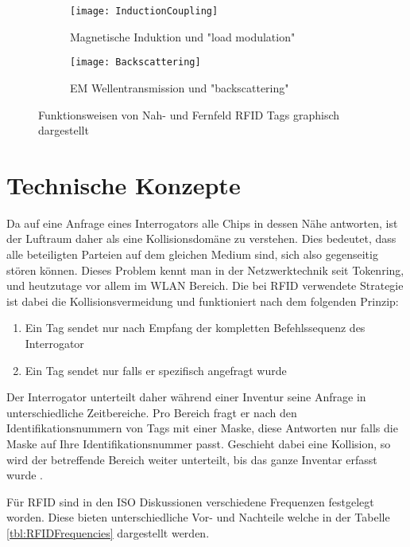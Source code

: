 \begin{figure}[htb]
	\centering
	\begin{subfigure}[b]{0.8\linewidth}
		\centering
		\texttt{[image: InductionCoupling]}
		\caption{Magnetische Induktion und "load modulation"}
	\end{subfigure}
	\begin{subfigure}[b]{0.8\linewidth}
		\centering
		\texttt{[image: Backscattering]}
		\caption{EM Wellentransmission und "backscattering"}
	\end{subfigure}
	\caption{Funktionsweisen von Nah- und Fernfeld \gls{RFID} Tags graphisch dargestellt \parencite{want2006}}
\end{figure}

\section{Technische Konzepte}

Da auf eine Anfrage eines Interrogators alle Chips in dessen Nähe antworten, ist der Luft\-raum daher als eine Kollisionsdomäne zu verstehen. Dies bedeutet, dass alle beteiligten Parteien auf dem gleichen Medium sind, sich also gegenseitig stören können. Dieses Problem kennt man in der Netzwerktechnik seit Tokenring, und heutzutage vor allem im WLAN Bereich. Die bei \gls{RFID} verwendete Strategie ist dabei die Kollisionsvermeidung und funktioniert nach dem folgenden Prinzip:
\begin{enumerate}
	\item Ein Tag sendet nur nach Empfang der kompletten Befehlssequenz des Interrogator
	\item Ein Tag sendet nur falls er spezifisch angefragt wurde
\end{enumerate}
Der Interrogator unterteilt daher während einer Inventur seine Anfrage in unterschiedliche Zeitbereiche. Pro Bereich fragt er nach den Identifikationsnummern von Tags mit einer Maske, diese Antworten nur falls die Maske auf Ihre Identifikationsnummer passt. Geschieht dabei eine Kollision, so wird der betreffende Bereich weiter unterteilt, bis das ganze Inventar erfasst wurde \parencite{ISO15693-3}.

Für \gls{RFID} sind in den ISO Diskussionen verschiedene Frequenzen festgelegt worden. Diese bieten unterschiedliche Vor- und Nachteile welche in der Tabelle \ref{tbl:RFIDFrequencies} dargestellt werden.

